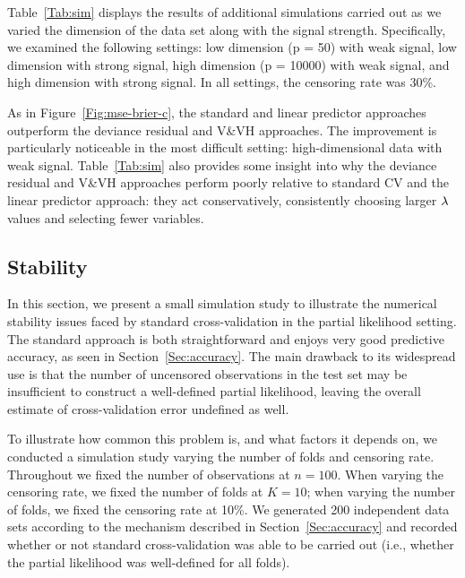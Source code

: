 Table~\ref{Tab:sim} displays the results of additional simulations carried out as we varied the dimension of the data set along with the signal strength.  Specifically, we examined the following settings: low dimension (p = 50) with weak signal, low dimension with strong signal, high dimension (p = 10000) with weak signal, and high dimension with strong signal. In all settings, the censoring rate was 30\%.

As in Figure~\ref{Fig:mse-brier-c}, the standard and linear predictor approaches outperform the deviance residual and V\&VH approaches.  The improvement is particularly noticeable in the most difficult setting: high-dimensional data with weak signal.  Table~\ref{Tab:sim} also provides some insight into why the deviance residual and V\&VH approaches perform poorly relative to standard CV and the linear predictor approach: they act conservatively, consistently choosing larger $\lambda$ values and selecting fewer variables.  

\subsection {Stability}
\label{Sec:stability}
  
\par In this section, we present a small simulation study to illustrate the numerical stability issues faced by standard cross-validation in the partial likelihood setting.  The standard approach is both straightforward and enjoys very good predictive accuracy, as seen in Section~\ref{Sec:accuracy}. The main drawback to its widespread use is that the number of uncensored observations in the test set may be insufficient to construct a well-defined partial likelihood, leaving the overall estimate of cross-validation error undefined as well.

To illustrate how common this problem is, and what factors it depends on, we conducted a simulation study varying the number of folds and censoring rate. Throughout we fixed the number of observations at $n = 100$. When varying the censoring rate, we fixed the number of folds at $K = 10$; when varying the number of folds, we fixed the censoring rate at 10\%. We generated 200 independent data sets according to the mechanism described in Section~\ref{Sec:accuracy} and recorded whether or not standard cross-validation was able to be carried out (i.e., whether the partial likelihood was well-defined for all folds).

